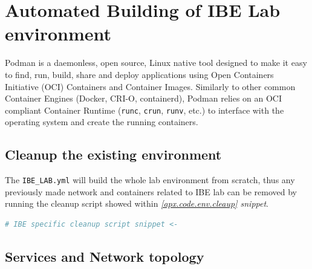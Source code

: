 
\section{Automated Building of IBE Lab environment}
\label{apx:lab-final_envbuild}

Podman is a daemonless, open source, Linux native tool designed to make it easy to find,
run, build, share and deploy applications
using Open Containers Initiative (OCI)\cite{oci.containers} Containers and
Container Images.\cite{podman} Similarly to other common Container Engines (Docker, CRI-O, containerd),
Podman relies on an OCI compliant Container Runtime (\lstinline{runc}, \lstinline{crun}, \lstinline{runv}, etc.)
to interface with the operating system and create the running containers.\cite{podman}

\subsection{Cleanup the existing environment}

The \lstinline{IBE_LAB.yml} will build the whole lab environment from scratch,
thus any previously made network and containers related to IBE lab can be removed
by running the cleanup script showed within \textit{\ref{apx.code.env.cleaup} snippet}.

\begin{lstlisting}[language=bash, caption=Host preparation for building the IBE environment, label=apx.code.env.cleaup]
    # IBE specific cleanup script snippet <-
\end{lstlisting}

\subsection{Services and Network topology}




